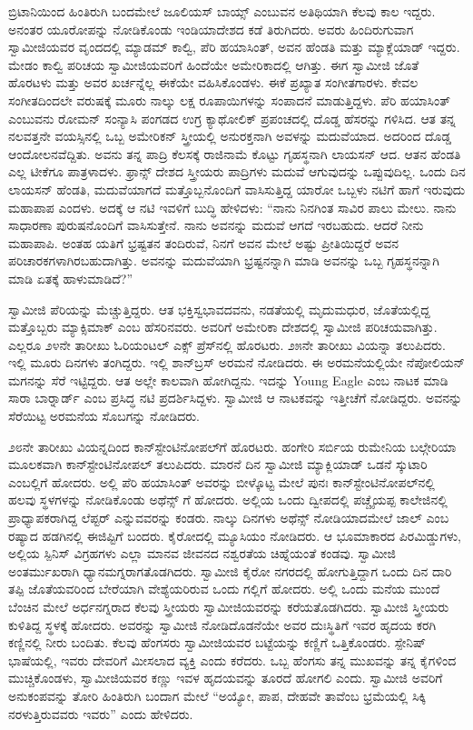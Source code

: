  ಬ್ರಿಟಾನಿಯಿಂದ ಹಿಂತಿರುಗಿ ಬಂದಮೇಲೆ ಜೂಲಿಯಸ್ ಬಾಯ್ಸ್ ಎಂಬುವನ ಅತಿಥಿಯಾಗಿ ಕೆಲವು ಕಾಲ ಇದ್ದರು. ಅನಂತರ ಯೂರೋಪನ್ನು ನೋಡಿಕೊಂಡು ಇಂಡಿಯಾದೇಶದ ಕಡೆ ತಿರುಗಿದರು. ಅವರು ಹಿಂದಿರುಗುವಾಗ ಸ್ವಾಮೀಜಿಯವರ ವೃಂದದಲ್ಲಿ ಮ್ಯಾಡಮ್ ಕಾಲ್ವಿ, ಪೆರಿ ಹಯಾಸಿಂತ್, ಅವನ ಹೆಂಡತಿ ಮತ್ತು ಮ್ಯಾಕ್ಲೆಯಾಡ್ ಇದ್ದರು. ಮೇಡಂ ಕಾಲ್ವಿ ಪರಿಚಯ ಸ್ವಾಮೀಜಿಯವರಿಗೆ ಹಿಂದೆಯೇ ಅಮೇರಿಕಾದಲ್ಲಿ ಆಗಿತ್ತು. ಈಗ ಸ್ವಾಮೀಜಿ ಜೊತೆ ಹೊರಟಳು ಮತ್ತು ಅವರ ಖರ್ಚನ್ನೆಲ್ಲ ಈಕೆಯೇ ವಹಿಸಿಕೊಂಡಳು. ಈಕೆ ಪ್ರಖ್ಯಾತ ಸಂಗೀತಗಾರಳು. ಕೇವಲ ಸಂಗೀತದಿಂದಲೇ ವರುಷಕ್ಕೆ ಮೂರು ನಾಲ್ಕು ಲಕ್ಷ ರೂಪಾಯಿಗಳನ್ನು ಸಂಪಾದನೆ ಮಾಡುತ್ತಿದ್ದಳು. ಪೆರಿ ಹಯಾಸಿಂತ್ ಎಂಬುವನು ರೋಮನ್ ಸಂನ್ಯಾಸಿ ಪಂಗಡದ ಉಗ್ರ ಕ್ಯಾಥೋಲಿಕ್ ಪ್ರಪಂಚದಲ್ಲಿ ದೊಡ್ಡ ಹೆಸರನ್ನು ಗಳಿಸಿದ. ಆತ ತನ್ನ ನಲವತ್ತನೇ ವಯಸ್ಸಿನಲ್ಲಿ ಒಬ್ಬ ಅಮೇರಿಕನ್ ಸ್ತ್ರೀಯಲ್ಲಿ ಅನುರಕ್ತನಾಗಿ ಅವಳನ್ನು ಮದುವೆಯಾದ. ಅದರಿಂದ ದೊಡ್ಡ ಆಂದೋಲನವೆದ್ದಿತು. ಅವನು ತನ್ನ ಪಾದ್ರಿ ಕೆಲಸಕ್ಕೆ ರಾಜಿನಾಮೆ ಕೊಟ್ಟು ಗೃಹಸ್ಥನಾಗಿ ಲಾಯಸನ್ ಆದ. ಆತನ ಹೆಂಡತಿ ಎಲ್ಲ ಟೀಕೆಗೂ ಪಾತ್ರಳಾದಳು. ಫ್ರಾನ್ಸ್ ದೇಶದ ಸ್ತ್ರೀಯರು ಪಾದ್ರಿಗಳು ಮದುವೆ ಆಗುವುದನ್ನು ಒಪ್ಪುವುದಿಲ್ಲ. ಒಂದು ದಿನ ಲಾಯಸನ್ ಹೆಂಡತಿ, ಮದುವೆಯಾಗದೆ ಮತ್ತೊಬ್ಬನೊಂದಿಗೆ ವಾಸಿಸುತ್ತಿದ್ದ ಯಾರೋ ಒಬ್ಬಳು ನಟಿಗೆ ಹಾಗೆ ಇರುವುದು ಮಹಾಪಾಪ ಎಂದಳು. ಅದಕ್ಕೆ ಆ ನಟಿ ಇವಳಿಗೆ ಬುದ್ಧಿ ಹೇಳಿದಳು: “ನಾನು ನಿನಗಿಂತ ಸಾವಿರ ಪಾಲು ಮೇಲು. ನಾನು ಸಾಧಾರಣಾ ಪುರುಷನೊಂದಿಗೆ ವಾಸಿಸುತ್ತೇನೆ. ನಾನು ಅವನನ್ನು ಮದುವೆ ಆಗದೆ ಇರಬಹುದು. ಆದರೆ ನೀನು ಮಹಾಪಾಪಿ. ಅಂತಹ ಯತಿಗೆ ಭ್ರಷ್ಟತನ ತಂದಿರುವೆ, ನಿನಗೆ ಅವನ ಮೇಲೆ ಅಷ್ಟು ಪ್ರೀತಿಯಿದ್ದರೆ ಅವನ ಪರಿಚಾರಕಗಳಾಗಿರಬಹುದಾಗಿತ್ತು. ಅವನನ್ನು ಮದುವೆಯಾಗಿ ಭ್ರಷ್ಟನನ್ನಾಗಿ ಮಾಡಿ ಅವನನ್ನು ಒಬ್ಬ ಗೃಹಸ್ಥನನ್ನಾಗಿ ಮಾಡಿ ಏತಕ್ಕೆ ಹಾಳುಮಾಡಿದೆ?” 

 ಸ್ವಾಮೀಜಿ ಪೆರಿಯನ್ನು ಮೆಚ್ಚುತ್ತಿದ್ದರು. ಆತ ಭಕ್ತಿಸ್ವಭಾವದವನು, ನಡತೆಯಲ್ಲಿ ಮೃದುಮಧುರ, ಜೊತೆಯಲ್ಲಿದ್ದ ಮತ್ತೊಬ್ಬರು ಮ್ಯಾಕ್ಸಿಮಾಕ್ ಎಂಬ ಹೆಸರಿನವರು. ಅವರಿಗೆ ಅಮೇರಿಕಾ ದೇಶದಲ್ಲಿ ಸ್ವಾಮೀಜಿ ಪರಿಚಯವಾಗಿತ್ತು. ಎಲ್ಲರೂ ೨೪ನೇ ತಾರೀಖು ಓರಿಯಂಟಲ್ ಎಕ್ಸ್ ಪ್ರೆಸ್‍ನಲ್ಲಿ ಹೊರಟರು. ೨೫ನೇ ತಾರೀಖು ವಿಯನ್ನಾ ತಲುಪಿದರು. ಇಲ್ಲಿ ಮೂರು ದಿನಗಳು ತಂಗಿದ್ದರು. ಇಲ್ಲಿ ಶಾನ್‍ಬ್ರಸ್ ಅರಮನೆ ನೋಡಿದರು. ಈ ಅರಮನೆಯಲ್ಲಿಯೇ ನೆಪೋಲಿಯನ್ ಮಗನನ್ನು ಸೆರೆ ಇಟ್ಟಿದ್ದರು. ಆತ ಅಲ್ಲೇ ಕಾಲವಾಗಿ ಹೋಗಿದ್ದನು. ಇದನ್ನು Young Eagle ಎಂಬ ನಾಟಕ ಮಾಡಿ ಸಾರಾ ಬಾರ್‍ನಾರ್ಡ್ ಎಂಬ ಪ್ರಸಿದ್ಧ ನಟಿ ಪ್ರದರ್ಶಿಸಿದ್ದಳು. ಸ್ವಾಮೀಜಿ ಆ ನಾಟಕವನ್ನು ಇತ್ತೀಚೆಗೆ ನೋಡಿದ್ದರು. ಅವನನ್ನು ಸೆರೆಯಿಟ್ಟ ಅರಮನೆಯ ಸೊಬಗನ್ನು ನೋಡಿದರು. 

 ೨೮ನೇ ತಾರೀಖು ವಿಯನ್ನದಿಂದ ಕಾನ್‍ಸ್ಟೇಂಟಿನೋಪಲ್‍ಗೆ ಹೊರಟರು. ಹಂಗೇರಿ ಸರ್ಬಿಯ ರುಮೇನಿಯ ಬಲ್ಗೇರಿಯಾ ಮೂಲಕವಾಗಿ ಕಾನ್‍ಸ್ಟೇಂಟಿನೋಪಲ್‍ ತಲುಪಿದರು. ಮಾರನೆ ದಿನ ಸ್ವಾಮೀಜಿ ಮ್ಯಾಕ್ಲಿಯಾಡ್ ಒಡನೆ ಸ್ಕುಟಾರಿ ಎಂಬಲ್ಲಿಗೆ ಹೋದರು. ಅಲ್ಲಿ ಪೆರಿ ಹಯಾಸಿಂತ್ ಅವರನ್ನು ಬೀಳ್ಕೊಟ್ಟ ಮೇಲೆ ಪುನಃ ಕಾನ್‍ಸ್ಟೇಂಟಿನೋಪಲ್‍ನಲ್ಲಿ ಹಲವು ಸ್ಥಳಗಳನ್ನು ನೋಡಿಕೊಂಡು ಅಥೆನ್ಸ್ ಗೆ ಹೋದರು. ಅಲ್ಲಿಯ ಒಂದು ದ್ವೀಪದಲ್ಲಿ ಪಚ್ಚೈಯಪ್ಪ ಕಾಲೇಜಿನಲ್ಲಿ ಪ್ರಾಧ್ಯಾಪಕರಾಗಿದ್ದ ಲೆಪ್ಟರ್ ಎನ್ನುವವರನ್ನು ಕಂಡರು. ನಾಲ್ಕು ದಿನಗಳು ಅಥೆನ್ಸ್ ನೋಡಿಯಾದಮೇಲೆ ಜಾಲ್ ಎಂಬ ರಷ್ಯಾದ ಹಡಗಿನಲ್ಲಿ ಈಜಿಪ್ಟಿಗೆ ಬಂದರು. ಕೈರೋದಲ್ಲಿ ಮ್ಯೂಸಿಯಂ ನೋಡಿದರು. ಆ ಭೂಮಾಕಾರದ ಪಿರಮಿಡ್ಡುಗಳು, ಅಲ್ಲಿಯ ಸ್ಪಿನಿಸ್ ವಿಗ್ರಹಗಳು ಎಲ್ಲಾ ಮಾನವ ಜೀವನದ ನಶ್ವರತೆಯ ಚಿಹ್ನೆಯಂತೆ ಕಂಡವು. ಸ್ವಾಮೀಜಿ ಅಂತರ್ಮುಖರಾಗಿ ಧ್ಯಾನಮಗ್ನರಾಗತೊಡಗಿದರು. ಸ್ವಾಮೀಜಿ ಕೈರೋ ನಗರದಲ್ಲಿ ಹೋಗುತ್ತಿದ್ದಾಗ ಒಂದು ದಿನ ದಾರಿ ತಪ್ಪಿ ಜೊತೆಯವರಿಂದ ಬೇರೆಯಾಗಿ ವೇಶ್ಯೆಯರಿರುವ ಒಂದು ಗಲ್ಲಿಗೆ ಹೋದರು. ಅಲ್ಲಿ ಒಂದು ಮನೆಯ ಮುಂದೆ ಬೆಂಚಿನ ಮೇಲೆ ಅರ್ಧನಗ್ನರಾದ ಕೆಲವು ಸ್ತ್ರೀಯರು ಸ್ವಾಮೀಜಿಯವರನ್ನು ಕರೆಯತೊಡಗಿದರು. ಸ್ವಾಮೀಜಿ ಸ್ತ್ರೀಯರು ಕುಳಿತಿದ್ದ ಸ್ಥಳಕ್ಕೆ ಹೋದರು. ಅವರನ್ನು ಸ್ವಾಮೀಜಿ ನೋಡಿದೊಡನೆಯೇ ಅವರ ದುಃಸ್ಥಿತಿಗೆ ಇವರ ಹೃದಯ ಕರಗಿ ಕಣ್ಣಿನಲ್ಲಿ ನೀರು ಬಂದಿತು. ಕೆಲವು ಹೆಂಗಸರು ಸ್ವಾಮೀಜಿಯವರ ಬಟ್ಟೆಯನ್ನು ಕಣ್ಣಿಗೆ ಒತ್ತಿಕೊಂಡರು. ಸ್ಪೇನಿಷ್ ಭಾಷೆಯಲ್ಲಿ, ಇವರು ದೇವರಿಗೆ ಮೀಸಲಾದ ವ್ಯಕ್ತಿ ಎಂದು ಕರೆದರು. ಒಬ್ಬ ಹೆಂಗಸು ತನ್ನ ಮುಖವನ್ನು ತನ್ನ ಕೈಗಳಿಂದ ಮುಚ್ಚಿಕೊಂಡಳು, ಸ್ವಾಮೀಜಿಯವರ ಕಣ್ಣು ಇವಳ ಹೃದಯವನ್ನು ತೂರದೆ ಹೋಗಲಿ ಎಂದು. ಸ್ವಾಮೀಜಿ ಅವರಿಗೆ ಅನುಕಂಪವನ್ನು ತೋರಿ ಹಿಂತಿರುಗಿ ಬಂದಾಗ ಮೇಲೆ “ಅಯ್ಯೋ, ಪಾಪ, ದೇಹವೇ ತಾವೆಂಬ ಭ್ರಮೆಯಲ್ಲಿ ಸಿಕ್ಕಿ ನರಳುತ್ತಿರುವವರು ಇವರು” ಎಂದು ಹೇಳಿದರು. 

